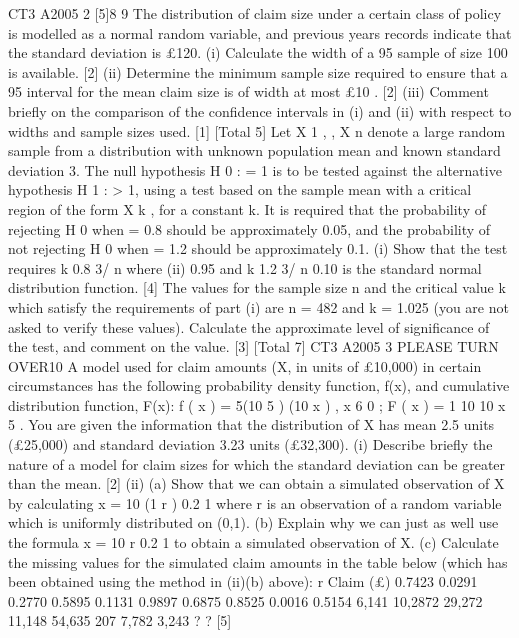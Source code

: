 \documentclass[a4paper,12pt]{article}
\begin{document}
\begin{enumerate}
CT3 A2005
2
[5]8
9
The distribution of claim size under a certain class of policy is modelled as a normal
random variable, and previous years records indicate that the standard deviation is
£120.
(i) Calculate the width of a 95%
sample of size 100 is available.
[2]
(ii) Determine the minimum sample size required to ensure that a 95%
interval for the mean claim size is of width at most £10 .
[2]
(iii) Comment briefly on the comparison of the confidence intervals in (i) and (ii)
with respect to widths and sample sizes used.
[1]
[Total 5]
Let X 1 , , X n denote a large random sample from a distribution with unknown
population mean and known standard deviation 3. The null hypothesis H 0 : = 1 is
to be tested against the alternative hypothesis H 1 : > 1, using a test based on the
sample mean with a critical region of the form X
k , for a constant k.
It is required that the probability of rejecting H 0 when = 0.8 should be
approximately 0.05, and the probability of not rejecting H 0 when = 1.2 should be
approximately 0.1.
(i)
Show that the test requires
k 0.8
3/ n
where
(ii)
0.95 and
k 1.2
3/ n
0.10
is the standard normal distribution function.
[4]
The values for the sample size n and the critical value k which satisfy the
requirements of part (i) are n = 482 and k = 1.025 (you are not asked to verify
these values).
Calculate the approximate level of significance of the test, and comment on
the value.
[3]
[Total 7]
CT3 A2005
3
PLEASE TURN OVER10
A model used for claim amounts (X, in units of £10,000) in certain circumstances has
the following probability density function, f(x), and cumulative distribution function,
F(x):
f ( x ) =
5(10 5 )
(10 x )
, x
6
0 ; F ( x ) = 1
10
10 x
5
.
You are given the information that the distribution of X has mean 2.5 units (£25,000)
and standard deviation 3.23 units (£32,300).
(i) Describe briefly the nature of a model for claim sizes for which the standard
deviation can be greater than the mean.
[2]
(ii) (a)
Show that we can obtain a simulated observation of X by calculating
x = 10 (1 r )
0.2
1
where r is an observation of a random variable which is uniformly
distributed on (0,1).
(b)
Explain why we can just as well use the formula
x = 10 r
0.2
1
to obtain a simulated observation of X.
(c)
Calculate the missing values for the simulated claim amounts in the
table below (which has been obtained using the method in (ii)(b)
above):
r Claim (£)
0.7423
0.0291
0.2770
0.5895
0.1131
0.9897
0.6875
0.8525
0.0016
0.5154 6,141
10,2872
29,272
11,148
54,635
207
7,782
3,243
?
?
[5]


\end{enumerate}
\end{document}
